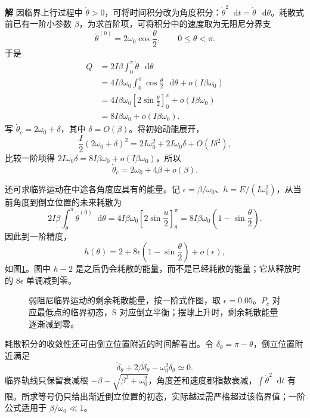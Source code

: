 \documentclass[11pt,openany,fontset=fandol]{ctexbook}
\theoremstyle{definition}\newtheorem{example}{例}[chapter]\newtheorem{exercise}{习题}[chapter]
\newcommand{\SolutionStart}{\par\medskip\ifdim\pagetotal>0pt\ifdim\dimexpr\pagegoal-\pagetotal\relax<3\baselineskip\newpage\fi\fi\noindent\textbf{解}\quad\ignorespaces}
\newenvironment{solution}{\SolutionStart}{\par\medskip}
\newcommand{\dd}{\mathop{}\!\mathrm d}\newcommand{\ee}{\mathrm e}\newcommand{\vct}[1]{\bm{#1}}
\begin{document}
\begin{solution}
因临界上行过程中 $\dot\theta>0$，可将时间积分改为角度积分：$\dot\theta^2\dd t=\dot\theta\,\dd\theta$。耗散式前已有一阶小参数 $\beta$，为求首阶项，可将积分中的速度取为无阻尼分界支
\[
\dot\theta^{(0)}=2\omega_0\cos\frac\theta2,
\qquad 0\le\theta<\pi.
\]
于是
\begin{align*}
Q&=2I\beta\int_0^\pi\dot\theta\,\dd\theta\\
&=4I\beta\omega_0\int_0^\pi\cos\frac\theta2\,\dd\theta
+o(I\beta\omega_0)\\
&=4I\beta\omega_0\left[2\sin\frac\theta2\right]_0^\pi
+o(I\beta\omega_0)\\
&=8I\beta\omega_0+o(I\beta\omega_0).
\end{align*}
写 $\dot\theta_c=2\omega_0+\delta$，其中 $\delta=O(\beta)$。将初始动能展开，
\[
\frac I2(2\omega_0+\delta)^2
=2I\omega_0^2+2I\omega_0\delta+O(I\delta^2),
\]
比较一阶项得 $2I\omega_0\delta=8I\beta\omega_0+o(I\beta\omega_0)$，所以
\[
\boxed{\dot\theta_c=2\omega_0+4\beta+o(\beta).}
\]

还可求临界运动在中途各角度应具有的能量。记 $\epsilon=\beta/\omega_0$、$h=E/(I\omega_0^2)$，从当前角度到倒立位置的未来耗散为
\[
2I\beta\int_\theta^\pi\dot\theta^{(0)}\dd\theta
=4I\beta\omega_0\left[2\sin\frac u2\right]_\theta^\pi
=8I\beta\omega_0\left(1-\sin\frac\theta2\right).
\]
因此到一阶精度，
\[
h(\theta)=2+8\epsilon\left(1-\sin\frac\theta2\right)+o(\epsilon),
\]
如图\ref{mp4:fig:l4-h12-energy}。图中 $h-2$ 是之后仍会耗散的能量，而不是已经耗散的能量；它从释放时的 $8\epsilon$ 单调减到零。

\begin{figure}[H]\centering
{}
\caption{弱阻尼临界运动的剩余耗散能量，按一阶式作图，取 $\epsilon=0.05$。$P_c$ 对应最低点的临界初态，S 对应倒立平衡；摆球上升时，剩余耗散能量逐渐减到零。}\label{mp4:fig:l4-h12-energy}
\end{figure}

耗散积分的收敛性还可由倒立位置附近的时间解看出。令 $\delta_\theta=\pi-\theta$，倒立位置附近满足
\[
\ddot\delta_\theta+2\beta\dot\delta_\theta-\omega_0^2\delta_\theta\simeq0.
\]
临界轨线只保留衰减根 $-\beta-\sqrt{\beta^2+\omega_0^2}$，角度差和速度都指数衰减，$\int\dot\theta^2\dd t$ 有限。所求等号仍只给出渐近倒立位置的初态，实际越过需严格超过该临界值；一阶公式适用于 $\beta/\omega_0\ll1$。
\end{solution}
\end{document}
